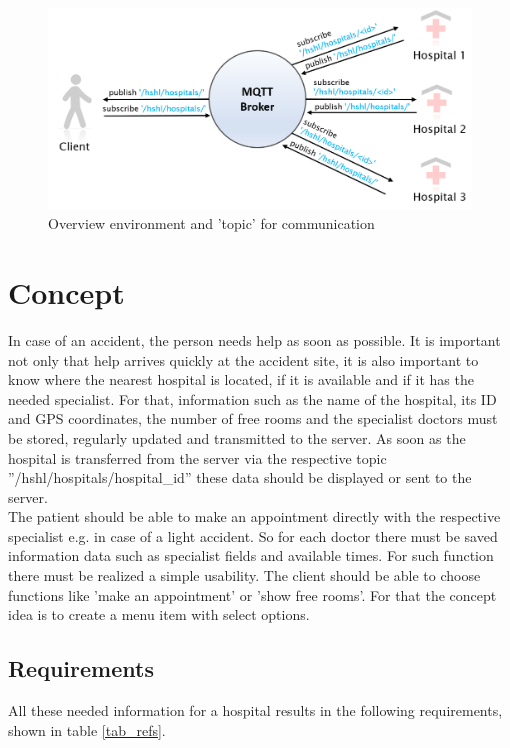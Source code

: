 \begin{figure}[H]
\centering
\sidecaption
\includegraphics[scale=.375]{images/melanie_images/Bild1-5.png}
\caption{Overview environment and 'topic' for communication}
\label{Overview environment}
\end{figure}



\section{Concept}
\label{sec:3}
In case of an accident, the person needs help as soon as possible. 
It is important not only that help arrives quickly at the accident site, 
it is also important to know where the nearest hospital is located, 
if it is available and if it has the needed specialist. For that, information such as the name of the hospital, its ID and  GPS coordinates, the number of free rooms and the specialist doctors must be stored, regularly updated and transmitted to the server.
As soon as the hospital is transferred from the server via the respective topic ''/hshl/hospitals/hospital_id'' 
these data should be displayed or sent to the server. 
\\
The patient should be able to make an appointment directly with the respective specialist e.g. in case of a light accident.
So for each doctor there must be saved information data such as specialist fields and available times.
For such function there must be realized a simple usability. The client should be able to choose functions like 'make an appointment' or 'show free rooms'. For that the concept idea is to create a menu item with select options.


\subsection{Requirements}
All these needed information for a hospital results in the following requirements, shown in table \ref{tab_refs}.

